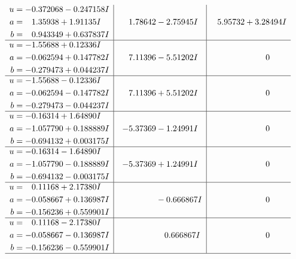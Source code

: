 \documentclass[1p]{elsarticle_modified}
\theoremstyle{definition}
\begin{document}
$$\begin{array}{c|c|c}
\begin{aligned}
u &= -0.372068 - 0.247158 I \\
a &= \phantom{-}1.35938 + 1.91135 I \\
b &= \phantom{-}0.943349 + 0.637837 I\end{aligned}
 & \phantom{-}1.78642 - 2.75945 I & \phantom{-}5.95732 + 3.28494 I \\ \hline\begin{aligned}
u &= -1.55688 + 0.12336 I \\
a &= -0.062594 + 0.147782 I \\
b &= -0.279473 + 0.044237 I\end{aligned}
 & \phantom{-}7.11396 - 5.51202 I & \phantom{-0.000000 } 0 \\ \hline\begin{aligned}
u &= -1.55688 - 0.12336 I \\
a &= -0.062594 - 0.147782 I \\
b &= -0.279473 - 0.044237 I\end{aligned}
 & \phantom{-}7.11396 + 5.51202 I & \phantom{-0.000000 } 0 \\ \hline\begin{aligned}
u &= -0.16314 + 1.64890 I \\
a &= -1.057790 + 0.188889 I \\
b &= -0.694132 + 0.003175 I\end{aligned}
 & -5.37369 - 1.24991 I & \phantom{-0.000000 } 0 \\ \hline\begin{aligned}
u &= -0.16314 - 1.64890 I \\
a &= -1.057790 - 0.188889 I \\
b &= -0.694132 - 0.003175 I\end{aligned}
 & -5.37369 + 1.24991 I & \phantom{-0.000000 } 0 \\ \hline\begin{aligned}
u &= \phantom{-}0.11168 + 2.17380 I \\
a &= -0.058667 + 0.136987 I \\
b &= -0.156236 + 0.559901 I\end{aligned}
 & \phantom{-0.000000 } -0.666867 I & \phantom{-0.000000 } 0 \\ \hline\begin{aligned}
u &= \phantom{-}0.11168 - 2.17380 I \\
a &= -0.058667 - 0.136987 I \\
b &= -0.156236 - 0.559901 I\end{aligned}
 & \phantom{-0.000000 -}0.666867 I & \phantom{-0.000000 } 0\\
 \hline 
 \end{array}$$\newpage\newpage\renewcommand{\arraystretch}{1}
\end{document}
